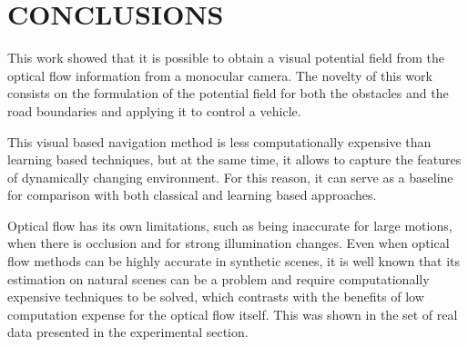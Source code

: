 \documentclass[letterpaper, 10 pt, conference]{ieeeconf}  %
\begin{document}





\section{CONCLUSIONS}

This work showed that it is possible to obtain a visual potential field from the optical flow information from a monocular camera. The novelty of this work consists on the formulation of the potential field for both the obstacles and the road boundaries and applying it to control a vehicle. 



This visual based navigation method is less computationally expensive than learning based techniques, but at the same time, it allows to capture the features of dynamically changing environment. For this reason, it can serve as a baseline for comparison with both classical and learning based approaches.

Optical flow has its own limitations, such as being inaccurate for large motions, when there is occlusion and for strong illumination changes. Even when optical flow methods can be highly accurate in synthetic scenes, it is well known that its estimation on natural scenes can be a problem and require computationally expensive techniques to be solved, which contrasts with the benefits of low computation expense for the optical flow itself. This was shown in the set of real data presented in the experimental section.
\end{document}

